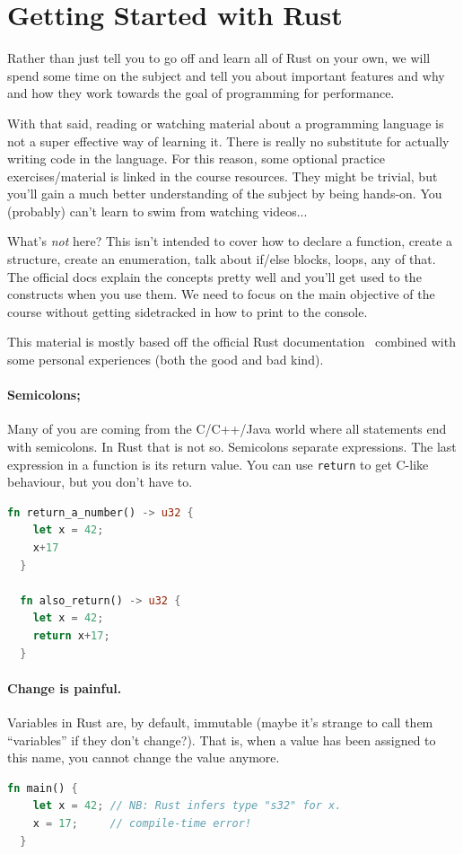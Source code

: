 




\section*{Getting Started with Rust}
Rather than just tell you to go off and learn all of Rust on your own, we will spend some time on the subject and tell you about important features and why and how they work towards the goal of programming for performance.

With that said, reading or watching material about a programming language is not a super effective way of learning it. There is really no substitute for actually writing code in the language. For this reason, some optional practice exercises/material is linked in the course resources. They might be trivial, but you'll gain a much better understanding of the subject by being hands-on. You (probably) can't learn to swim from watching videos...

What's \textit{not} here? This isn't intended to cover how to declare a function, create a structure, create an enumeration, talk about if/else blocks, loops, any of that. The official docs explain the concepts pretty well and you'll get used to the constructs when you use them. We need to focus on the main objective of the course without getting sidetracked in how to print to the console. 

This material is mostly based off the official Rust documentation~\cite{rustdocs} combined with some personal experiences (both the good and bad kind). 

\paragraph{Semicolons;} Many of you are coming from the C/C++/Java world where all statements end with semicolons. In Rust that is
not so. Semicolons separate expressions. The last expression in a function is its return value. You can use \texttt{return} to get
C-like behaviour, but you don't have to.
\begin{lstlisting}[language=Rust]
  fn return_a_number() -> u32 {
    let x = 42;
    x+17
  }

  fn also_return() -> u32 {
    let x = 42;
    return x+17;
  }
\end{lstlisting}

\paragraph{Change is painful.}
Variables in Rust are, by default, immutable (maybe it's strange to call them ``variables'' if they don't change?). That is, when a value has been assigned to this name, you cannot change the value anymore.
\begin{lstlisting}[language=Rust]
  fn main() {
    let x = 42; // NB: Rust infers type "s32" for x.
    x = 17;     // compile-time error!
  }
\end{lstlisting}

